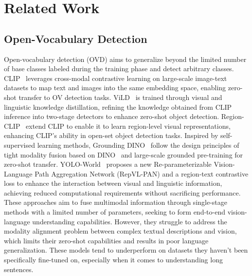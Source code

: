 \section{Related Work}
\subsection{Open-Vocabulary Detection}
Open-vocabulary detection (OVD) aims to generalize beyond the limited number of base classes labeled during the training phase and detect arbitrary classes. CLIP~\cite{pmlr-v139-radford21a} leverages cross-modal contrastive learning on large-scale image-text datasets to map text and images into the same embedding space, enabling zero-shot transfer to OV detection tasks. ViLD~\cite{zhong2022regionclip} is trained through visual and linguistic knowledge distillation, refining the knowledge obtained from CLIP inference into two-stage detectors to enhance zero-shot object detection. Region-CLIP~\cite{zhong2022regionclip} extend CLIP to enable it to learn region-level visual representations, enhancing CLIP's ability in open-set object detection tasks. Inspired by self-supervised learning methods, Grounding DINO~\cite{liu2025grounding} follow the design principles of tight modality fusion based on DINO~\cite{zhang2022dino} and large-scale grounded pre-training for zero-shot transfer. YOLO-World~\cite{cheng2024yolo} proposes a new Re-parameterizable Vision-Language Path Aggregation Network (RepVL-PAN) and a region-text contrastive loss to enhance the interaction between visual and linguistic information, achieving reduced computational requirements without sacrificing performance. These approaches aim to fuse multimodal information through single-stage methods with a limited number of parameters, seeking to form end-to-end vision-language understanding capabilities. However, they struggle to address the modality alignment problem between complex textual descriptions and vision, which limits their zero-shot capabilities and results in poor language generalization. These models tend to underperform on datasets they haven't been specifically fine-tuned on, especially when it comes to understanding long sentences.

